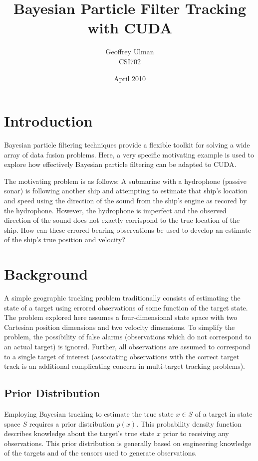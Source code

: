 \documentclass{article}
\begin{document}
\title{Bayesian Particle Filter Tracking with CUDA}
\author{Geoffrey Ulman\\
        CSI702}
\date{April 2010}
\maketitle

\tableofcontents

\section{Introduction}
Bayesian particle filtering techniques provide a flexible toolkit for solving a wide array of data fusion problems. Here, a very specific motivating example is used to explore how effectively Bayesian particle filtering can be adapted to CUDA.

The motivating problem is as follows: A submarine with a hydrophone (passive sonar) is following another ship and attempting to estimate that ship's location and speed using the direction of the sound from the ship's engine as recored by the hydrophone. However, the hydrophone is imperfect and the observed direction of the sound does not exactly corrispond to the true location of the ship. How can these errored bearing observations be used to develop an estimate of the ship's true position and velocity?

\section{Background}\label{Background}
A simple geographic tracking problem traditionally consists of estimating the state of a target using errored observations of some function of the target state. The problem explored here assumes a four-dimensional state space with two Cartesian position dimensions and two velocity dimensions. To simplify the problem, the possibility of false alarms (observations which do not correspond to an actual target) is ignored. Further, all observations are assumed to correspond to a single target of interest (associating observations with the correct target track is an additional complicating concern in multi-target tracking problems).

\subsection{Prior Distribution}
Employing Bayesian tracking to estimate the true state \(x \in S\) of a target in state space \(S\) requires a prior distribution \(p(x)\). This probability density function describes knowledge about the target's true state \(x\) prior to receiving any observations. This prior distribution is generally based on engineering knowledge of the targets and of the sensors used to generate observations.
\end{document}

